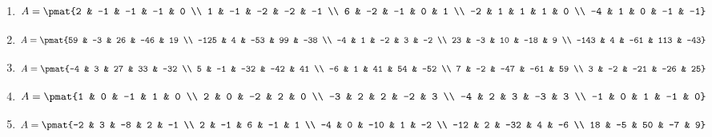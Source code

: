 \begin{enumerate}
\item

\begin{align*}
A = \pmat{2 & -1 & -1 & -1 & 0 \\ 1 & -1 & -2 & -2 & -1 \\ 6 & -2 & -1 & 0 & 1 \\ -2 & 1 & 1 & 1 & 0 \\ -4 & 1 & 0 & -1 & -1}
\end{align*}

\item

\begin{align*}
A = \pmat{59 & -3 & 26 & -46 & 19 \\ -125 & 4 & -53 & 99 & -38 \\ -4 & 1 & -2 & 3 & -2 \\ 23 & -3 & 10 & -18 & 9 \\ -143 & 4 & -61 & 113 & -43}
\end{align*}

\item

\begin{align*}
A = \pmat{-4 & 3 & 27 & 33 & -32 \\ 5 & -1 & -32 & -42 & 41 \\ -6 & 1 & 41 & 54 & -52 \\ 7 & -2 & -47 & -61 & 59 \\ 3 & -2 & -21 & -26 & 25}
\end{align*}

\item

\begin{align*}
A = \pmat{1 & 0 & -1 & 1 & 0 \\ 2 & 0 & -2 & 2 & 0 \\ -3 & 2 & 2 & -2 & 3 \\ -4 & 2 & 3 & -3 & 3 \\ -1 & 0 & 1 & -1 & 0}
\end{align*}

\item

\begin{align*}
A = \pmat{-2 & 3 & -8 & 2 & -1 \\ 2 & -1 & 6 & -1 & 1 \\ -4 & 0 & -10 & 1 & -2 \\ -12 & 2 & -32 & 4 & -6 \\ 18 & -5 & 50 & -7 & 9}
\end{align*}


\end{enumerate}
